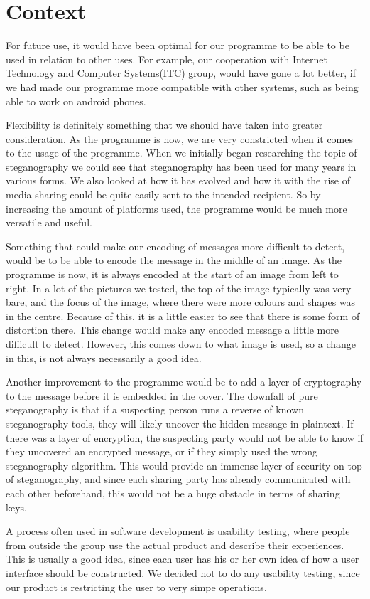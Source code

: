 \section{Context}
For future use, it would have been optimal for our programme to be able to be used in relation to other uses.
For example, our cooperation with Internet Technology and Computer Systems(ITC) group, would have gone a lot better, if we had made our programme more compatible with other systems, such as being able to work on android phones.

Flexibility is definitely something that we should have taken into greater consideration.
As the programme is now, we are very constricted when it comes to the usage of the programme.
When we initially began researching the topic of steganography we could see that steganography has been used for many years in various forms.
We also looked at how it has evolved and how it with the rise of media sharing could be quite easily sent to the intended recipient.
So by increasing the amount of platforms used, the programme would be much more versatile and useful.

Something that could make our encoding of messages more difficult to detect, would be to be able to encode the message in the middle of an image.
As the programme is now, it is always encoded at the start of an image from left to right.
In a lot of the pictures we tested, the top of the image typically was very bare, and the focus of the image, where there were more colours and shapes was in the centre.
Because of this, it is a little easier to see that there is some form of distortion there.
This change would make any encoded message a little more difficult to detect.
However, this comes down to what image is used, so a change in this, is not always necessarily a good idea.

Another improvement to the programme would be to add a layer of cryptography to the message before it is embedded in the cover.
The downfall of pure steganography is that if a suspecting person runs a reverse of known steganography tools, they will likely uncover the hidden message in plaintext.
If there was a layer of encryption, the suspecting party would not be able to know if they uncovered an encrypted message, or if they simply used the wrong steganography algorithm.
This would provide an immense layer of security on top of steganography, and since each sharing party has already communicated with each other beforehand, this would not be a huge obstacle in terms of sharing keys.

A process often used in software development is usability testing, where people from outside the group use the actual product and describe their experiences.
This is usually a good idea, since each user has his or her own idea of how a user interface should be constructed.
We decided not to do any usability testing, since our product is restricting the user to very simpe operations.